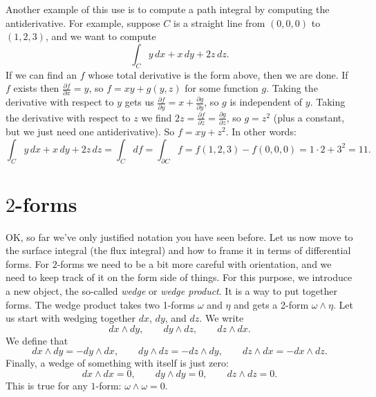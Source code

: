 \documentclass[12pt]{article}
\begin{document}
Another example of this use is to compute a path integral by computing the
antiderivative.  For example, suppose $C$ is a straight line from $(0,0,0)$
to $(1,2,3)$, and we want to compute
\begin{equation*}
\int_C y \, dx + x \, dy + 2z \, dz.
\end{equation*}
If we can find an $f$ whose total derivative is the form above, then
we are done.  If $f$ exists then $\frac{\partial f}{\partial x} = y$,
so $f = xy + g(y,z)$ for some function $g$.  Taking the derivative
with respect to $y$ gets us
$\frac{\partial f}{\partial y} = x + \frac{\partial g}{\partial y}$,
so $g$ is independent of $y$.  Taking the derivative with respect
to $z$ we find
$2z = \frac{\partial f}{\partial z} = \frac{\partial g}{\partial z}$,
so $g = z^2$ (plus a constant, but we just need one antiderivative).
So $f = xy+z^2$.  In other words:
\begin{equation*}
\int_C y \, dx + x \, dy + 2z \, dz
=
\int_C df = \int_{\partial C} f
= f(1,2,3) - f(0,0,0) = 1\cdot 2+3^2 = 11.
\end{equation*}

\section*{$2$-forms}

OK, so far we've only justified notation you have seen before.
Let us now move to the surface integral (the flux integral) and how to frame it in terms
of differential forms.
For $2$-forms we need to be a bit more careful with orientation, and we
need to keep track of it on the form side of things.  For this purpose, we introduce
a new object, the so-called \emph{wedge} or \emph{wedge product}.  It is a
way to put together forms.
The wedge product takes two 1-forms $\omega$ and $\eta$ and gets
a 2-form $\omega \wedge \eta$.  Let us start with wedging together $dx$, $dy$, and $dz$.
We write
\[
dx \wedge dy, \qquad
dy \wedge dz, \qquad
dz \wedge dx .
\]
We define that 
\[
dx \wedge dy = - dy \wedge dx, \qquad
dy \wedge dz = - dz \wedge dy, \qquad
dz \wedge dx = - dx \wedge dz .
\]
Finally, a wedge of something with itself is just zero:
\[
dx \wedge dx = 0, \qquad
dy \wedge dy = 0, \qquad
dz \wedge dz = 0 .
\]
This is true for any $1$-form: $\omega \wedge \omega = 0$.
\end{document}

